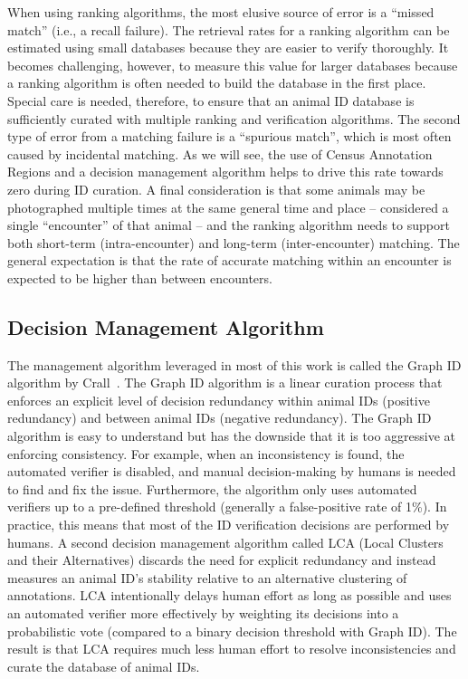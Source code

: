 When using ranking algorithms, the most elusive source of error is a ``missed match'' (i.e., a recall failure).  The retrieval rates for a ranking algorithm can be estimated using small databases because they are easier to verify thoroughly.  It becomes challenging, however, to measure this value for larger databases because a ranking algorithm is often needed to build the database in the first place.  Special care is needed, therefore, to ensure that an animal ID database is sufficiently curated with multiple ranking and verification algorithms.  The second type of error from a matching failure is a ``spurious match'', which is most often caused by incidental matching.  As we will see, the use of Census Annotation Regions and a decision management algorithm helps to drive this rate towards zero during ID curation.  A final consideration is that some animals may be photographed multiple times at the same general time and place -- considered a single ``encounter'' of that animal -- and the ranking algorithm needs to support both short-term (intra-encounter) and long-term (inter-encounter) matching.  The general expectation is that the rate of accurate matching within an encounter is expected to be higher than between encounters.

\subsection{Decision Management Algorithm}

The management algorithm leveraged in most of this work is called the Graph ID algorithm by Crall~\cite{crall_identifying_2017}.  The Graph ID algorithm is a linear curation process that enforces an explicit level of decision redundancy within animal IDs (positive redundancy) and between animal IDs (negative redundancy).  The Graph ID algorithm is easy to understand but has the downside that it is too aggressive at enforcing consistency.  For example, when an inconsistency is found, the automated verifier is disabled, and manual decision-making by humans is needed to find and fix the issue.  Furthermore, the algorithm only uses automated verifiers up to a pre-defined threshold (generally a false-positive rate of 1\%).  In practice, this means that most of the ID verification decisions are performed by humans.  A second decision management algorithm called LCA (Local Clusters and their Alternatives) discards the need for explicit redundancy and instead measures an animal ID's stability relative to an alternative clustering of annotations.  LCA intentionally delays human effort as long as possible and uses an automated verifier more effectively by weighting its decisions into a probabilistic vote (compared to a binary decision threshold with Graph ID).  The result is that LCA requires much less human effort to resolve inconsistencies and curate the database of animal IDs.

